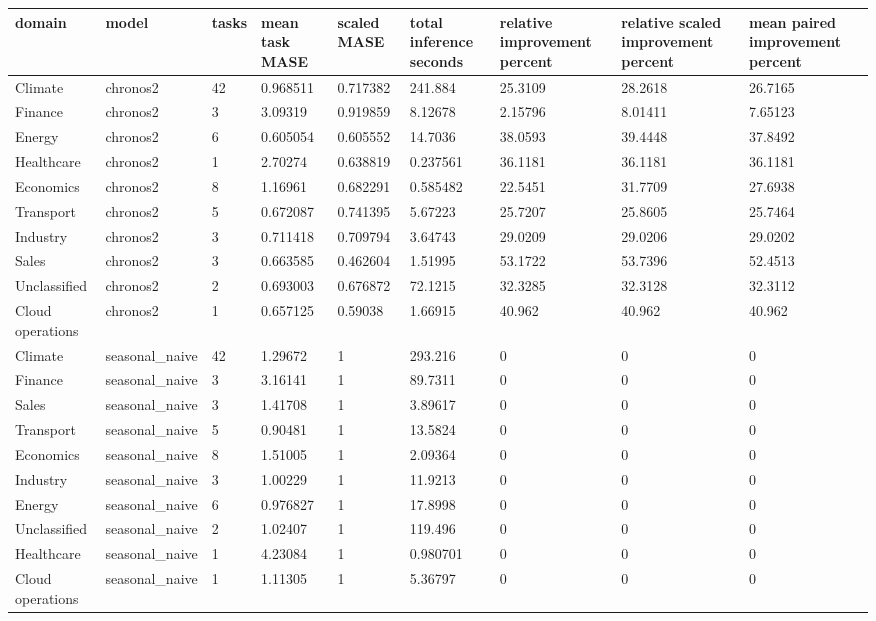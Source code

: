 \begin{tabular}{lllllllll}
\toprule
domain & model & tasks & mean task MASE & scaled MASE & total inference seconds & relative improvement percent & relative scaled improvement percent & mean paired improvement percent \\
\midrule
Climate & chronos2 & 42 & 0.968511 & 0.717382 & 241.884 & 25.3109 & 28.2618 & 26.7165 \\
Finance & chronos2 & 3 & 3.09319 & 0.919859 & 8.12678 & 2.15796 & 8.01411 & 7.65123 \\
Energy & chronos2 & 6 & 0.605054 & 0.605552 & 14.7036 & 38.0593 & 39.4448 & 37.8492 \\
Healthcare & chronos2 & 1 & 2.70274 & 0.638819 & 0.237561 & 36.1181 & 36.1181 & 36.1181 \\
Economics & chronos2 & 8 & 1.16961 & 0.682291 & 0.585482 & 22.5451 & 31.7709 & 27.6938 \\
Transport & chronos2 & 5 & 0.672087 & 0.741395 & 5.67223 & 25.7207 & 25.8605 & 25.7464 \\
Industry & chronos2 & 3 & 0.711418 & 0.709794 & 3.64743 & 29.0209 & 29.0206 & 29.0202 \\
Sales & chronos2 & 3 & 0.663585 & 0.462604 & 1.51995 & 53.1722 & 53.7396 & 52.4513 \\
Unclassified & chronos2 & 2 & 0.693003 & 0.676872 & 72.1215 & 32.3285 & 32.3128 & 32.3112 \\
Cloud operations & chronos2 & 1 & 0.657125 & 0.59038 & 1.66915 & 40.962 & 40.962 & 40.962 \\
Climate & seasonal\_naive & 42 & 1.29672 & 1 & 293.216 & 0 & 0 & 0 \\
Finance & seasonal\_naive & 3 & 3.16141 & 1 & 89.7311 & 0 & 0 & 0 \\
Sales & seasonal\_naive & 3 & 1.41708 & 1 & 3.89617 & 0 & 0 & 0 \\
Transport & seasonal\_naive & 5 & 0.90481 & 1 & 13.5824 & 0 & 0 & 0 \\
Economics & seasonal\_naive & 8 & 1.51005 & 1 & 2.09364 & 0 & 0 & 0 \\
Industry & seasonal\_naive & 3 & 1.00229 & 1 & 11.9213 & 0 & 0 & 0 \\
Energy & seasonal\_naive & 6 & 0.976827 & 1 & 17.8998 & 0 & 0 & 0 \\
Unclassified & seasonal\_naive & 2 & 1.02407 & 1 & 119.496 & 0 & 0 & 0 \\
Healthcare & seasonal\_naive & 1 & 4.23084 & 1 & 0.980701 & 0 & 0 & 0 \\
Cloud operations & seasonal\_naive & 1 & 1.11305 & 1 & 5.36797 & 0 & 0 & 0 \\
\bottomrule
\end{tabular}
